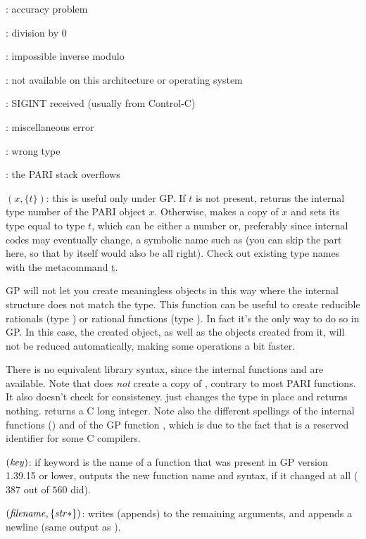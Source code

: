 : accuracy problem

: division by 0

: impossible inverse modulo

: not available on this architecture or operating system

: SIGINT received (usually from Control-C)

: miscellaneous error

: wrong type

: the PARI stack overflows

$(x,\{t\})$: this is useful only under GP. If $t$ is
not present, returns the internal type number of the PARI object $x$.
Otherwise, makes a copy of $x$ and sets its type equal to type $t$, which
can be either a number or, preferably since internal codes may eventually
change, a symbolic name such as  (you can skip the \typ{}
part here, so that  by itself would also be all right). Check out
existing type names with the metacommand \b{t}.\label{se:gptype}

  GP will not let you create meaningless objects in this way where the internal
structure does not match the type. This function can be useful to create
reducible rationals (type ) or rational functions (type
). In fact it's the only way to do so in GP. In this case, the
created object, as well as the objects created from it, will not be reduced
automatically, making some operations a bit faster.

There is no equivalent library syntax, since the internal functions 
and  are available. Note that  does \emph{not}
create a copy of , contrary to most PARI functions. It also doesn't
check for consistency.  just changes the type in place and
returns nothing.  returns a C long integer. Note also the different
spellings of the internal functions () and of the GP
function , which is due to the fact that  is a reserved
identifier for some C compilers.

$(\hbox{\it key\/})$: if keyword  is the name
of a function that was present in GP version 1.39.15 or lower, outputs
the new function name and syntax, if it changed at all ($387$ out of $560$
did).\label{se:whatnow}

$(\hbox{\it filename\/},\{\hbox{\it str\/}*\})$: writes (appends)
to  the remaining arguments, and appends a newline (same output
as ).\label{se:write}

